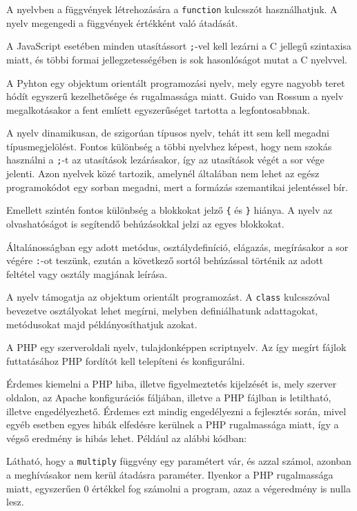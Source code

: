 A nyelvben a függvények létrehozására a \texttt{function} kulcsszót használhatjuk. A nyelv megengedi a függvények értékként való átadását.

A JavaScript esetében minden utasítássort \texttt{;}-vel kell lezárni a C jellegű szintaxisa miatt, és többi formai jellegzetességében is sok hasonlóságot mutat a C nyelvvel.


A Pyhton egy objektum orientált programozási nyelv, mely egyre nagyobb teret hódít egyszerű kezelhetősége és rugalmassága miatt. Guido van Rossum a nyelv megalkotásakor a fent emlíett egyszerűséget tartotta a legfontosabbnak.

A nyelv dinamikusan, de szigorúan típusos nyelv, tehát itt sem kell megadni típusmegjelölést.
Fontos különbség a többi nyelvhez képest, hogy nem szokás használni a \texttt{;}-t az utasítások lezárásakor, így az utasítások végét a sor vége jelenti. Azon nyelvek közé tartozik, amelynél általában nem lehet az egész programokódot egy sorban megadni, mert a formázás szemantikai jelentéssel bír.

Emellett szintén fontos különbség a blokkokat jelző \texttt{\{} és \texttt{\}} hiánya.
A nyelv az olvashatóságot is segítendő behúzásokkal jelzi az egyes blokkokat.

Általánosságban egy adott metódus, osztálydefiníció, elágazás, megírásakor a sor végére \texttt{:}-ot teszünk, ezután a következő sortól behúzással történik az adott feltétel vagy osztály magjának leírása.

A nyelv támogatja az objektum orientált programozást. A \texttt{class} kulcsszóval bevezetve osztályokat lehet megírni, melyben definiálhatunk adattagokat, metódusokat majd példányosíthatjuk azokat.


A PHP egy szerveroldali nyelv, tulajdonképpen scriptnyelv. Az így megírt fájlok futtatásához PHP fordítót kell telepíteni és konfigurálni.

Érdemes kiemelni a PHP hiba, illetve figyelmeztetés kijelzését is, mely szerver oldalon, az Apache konfigurációs fáljában, illetve a PHP fájlban is letiltható, illetve engedélyezhető. Érdemes ezt mindig engedélyezni a fejlesztés során, mivel egyéb esetben egyes hibák elfedésre kerülnek a PHP rugalmassága miatt, így a végső eredmény is hibás lehet. Például az alábbi kódban:
Látható, hogy a \texttt{multiply} függvény egy paramétert vár, és azzal számol, azonban a meghívásakor nem kerül átadásra paraméter. Ilyenkor a PHP rugalmassága miatt, egyszerűen 0 értékkel fog számolni a program, azaz a végeredmény is nulla lesz.

